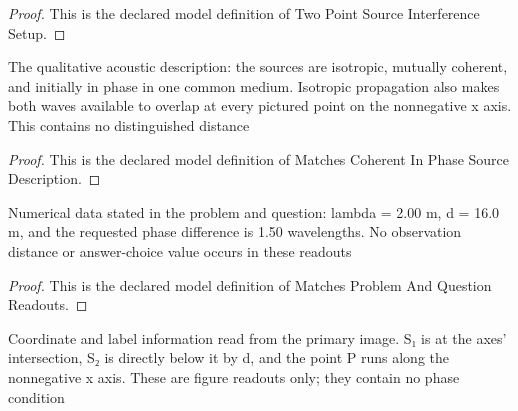 \begin{proof}
  This is the declared model definition of Two Point Source Interference Setup.
\end{proof}
\begin{definition}
  \label{def:physics:phyx-mini-0316:phyxminiproblems-problemphyxmini0316-matchescoherentinphasesourcedescription}
  The qualitative acoustic description: the sources are isotropic, mutually coherent, and initially in phase in one common medium. Isotropic propagation also makes both waves available to overlap at every pictured point on the nonnegative x axis. This contains no distinguished distance
\end{definition}
\begin{proof}
  This is the declared model definition of Matches Coherent In Phase Source Description.
\end{proof}
\begin{definition}
  \label{def:physics:phyx-mini-0316:phyxminiproblems-problemphyxmini0316-matchesproblemandquestionreadouts}
  Numerical data stated in the problem and question: lambda = 2.00 m, d = 16.0 m, and the requested phase difference is 1.50 wavelengths. No observation distance or answer-choice value occurs in these readouts
\end{definition}
\begin{proof}
  This is the declared model definition of Matches Problem And Question Readouts.
\end{proof}
\begin{definition}
  \label{def:physics:phyx-mini-0316:phyxminiproblems-problemphyxmini0316-matchessuppliedfigure}
  Coordinate and label information read from the primary image. S₁ is at the axes' intersection, S₂ is directly below it by d, and the point P runs along the nonnegative x axis. These are figure readouts only; they contain no phase condition
\end{definition}
